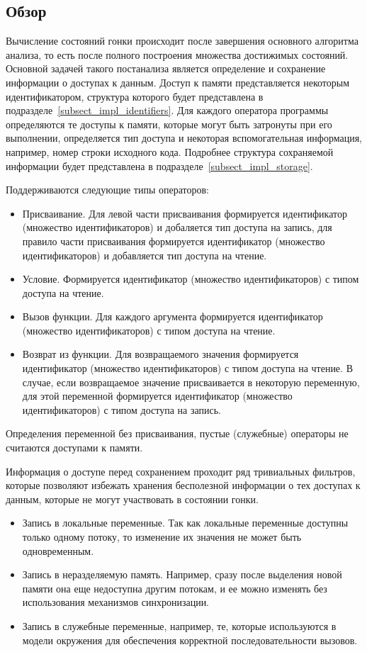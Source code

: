 \subsection{Обзор}
\label{subsect_impl_race_overview}
Вычисление состояний гонки происходит после завершения основного алгоритма анализа, то есть после полного построения множества достижимых состояний.
Основной задачей такого постанализа является определение и сохранение информации о доступах к данным. 
Доступ к памяти представляется некоторым идентификатором, структура которого будет представлена в подразделе~\ref{subsect_impl_identifiers}.
Для каждого оператора программы определяются те доступы к памяти, которые могут быть затронуты при его выполнении, определяется тип доступа и некоторая вспомогательная информация, например, номер строки исходного кода.
Подробнее структура сохраняемой информации будет представлена в подразделе~\ref{subsect_impl_storage}.

Поддерживаются следующие типы операторов:
\begin{itemize}
\item Присваивание. Для левой части присваивания формируется идентификатор (множество идентификаторов) и добаляется тип доступа на запись, для правило части присваивания формируется идентификатор (множество идентификаторов) и добавляется тип доступа на чтение.
\item Условие. Формируется идентификатор (множество идентификаторов) с типом доступа на чтение.
\item Вызов функции. Для каждого аргумента формируется идентификатор (множество идентификаторов) с типом доступа на чтение.
\item Возврат из функции. Для возвращаемого значения формируется идентификатор (множество идентификаторов) с типом доступа на чтение. В случае, если возвращаемое значение присваивается в некоторую переменную, для этой переменной формируется идентификатор (множество идентификаторов) с типом доступа на запись.
\end{itemize}
Определения переменной без присваивания, пустые (служебные) операторы не считаются доступами к памяти.

Информация о доступе перед сохранением проходит ряд тривиальных фильтров, которые позволяют избежать хранения бесполезной информации о тех доступах к данным, которые не могут участвовать в состоянии гонки.

\begin{itemize}
\item Запись в локальные переменные. Так как локальные переменные доступны только одному потоку, то изменение их значения не может быть одновременным.
\item Запись в неразделяемую память. Например, сразу после выделения новой памяти она еще недоступна другим потокам, и ее можно изменять без использования механизмов синхронизации.
\item Запись в служебные переменные, например, те, которые используются в модели окружения для обеспечения корректной последовательности вызовов. 
\end{itemize}

